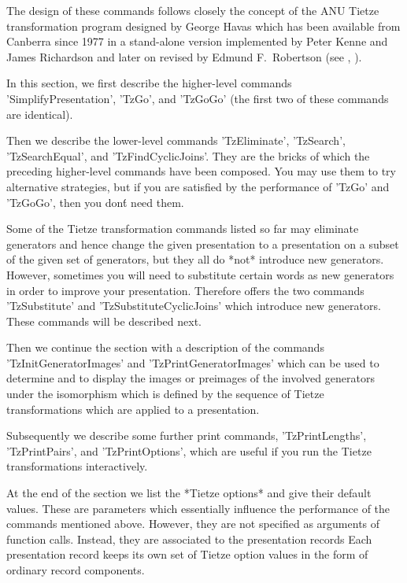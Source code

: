 The  design  of  these commands  follows closely the  concept of the  ANU
Tietze transformation program designed by George Havas \cite{Hav69} which
has been  available  from Canberra  since  1977 in a  stand-alone version
implemented by Peter  Kenne and  James Richardson and later on revised by
Edmund F.~Robertson (see \cite{HKRR84}, \cite{Rob88}).

\vspace{5mm} In this section, we first describe the higher-level commands
'SimplifyPresentation', 'TzGo',  and  'TzGoGo' (the  first two  of  these
commands are identical).

Then  we  describe  the  lower-level commands  'TzEliminate', 'TzSearch',
'TzSearchEqual', and  'TzFindCyclicJoins'.  They  are the bricks of which
the preceding higher-level commands have been composed.  You may use them
to  try  alternative  strategies,  but  if  you  are  satisfied  by   the
performance of 'TzGo' and 'TzGoGo', then you don\'t need them.

Some  of  the Tietze transformation commands listed so far  may eliminate
generators and hence change the given presentation to a presentation on a
subset  of  the  given set of generators, but they all do *not* introduce
new generators.  However,  sometimes you will need to  substitute certain
words as new generators in order to improve your presentation.  Therefore
{\GAP}     offers     the     two     commands     'TzSubstitute'     and
'TzSubstituteCyclicJoins' which introduce new generators.  These commands
will be described next.

Then we continue  the  section   with  a  description of  the    commands
'TzInitGeneratorImages' and 'TzPrintGeneratorImages' which can be used to
determine and to   display  the images  or   preimages of  the   involved
generators  under the  isomorphism  which is defined  by  the sequence of
Tietze transformations which are applied to a presentation.

Subsequently we describe  some further print  commands, 'TzPrintLengths',
'TzPrintPairs',  and 'TzPrintOptions', which are useful if  you  run  the
Tietze transformations interactively.

At the end of the section  we list the  *Tietze  options*  and give their
default  values.  These  are  parameters which essentially influence  the
performance  of  the commands mentioned  above.   However, they  are  not
specified as  arguments of function  calls.  Instead, they are associated
to the  presentation  records{\:} Each presentation record keeps  its own
set of Tietze option values in the form of ordinary record components.

